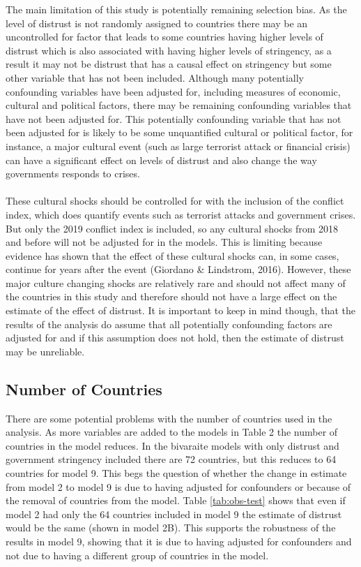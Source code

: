 \documentclass[
  12pt,
]{article}
\begin{document}
The main limitation of this study is potentially remaining selection bias. As the level of distrust is not randomly assigned to countries there may be an uncontrolled for factor that leads to some countries having higher levels of distrust which is also associated with having higher levels of stringency, as a result it may not be distrust that has a causal effect on stringency but some other variable that has not been included. Although many potentially confounding variables have been adjusted for, including measures of economic, cultural and political factors, there may be remaining confounding variables that have not been adjusted for. This potentially confounding variable that has not been adjusted for is likely to be some unquantified cultural or political factor, for instance, a major cultural event (such as large terrorist attack or financial crisis) can have a significant effect on levels of distrust and also change the way governments responds to crises.\\
~\\
These cultural shocks should be controlled for with the inclusion of the conflict index, which does quantify events such as terrorist attacks and government crises. But only the 2019 conflict index is included, so any cultural shocks from 2018 and before will not be adjusted for in the models. This is limiting because evidence has shown that the effect of these cultural shocks can, in some cases, continue for years after the event (Giordano \& Lindstrom, 2016). However, these major culture changing shocks are relatively rare and should not affect many of the countries in this study and therefore should not have a large effect on the estimate of the effect of distrust. It is important to keep in mind though, that the results of the analysis do assume that all potentially confounding factors are adjusted for and if this assumption does not hold, then the estimate of distrust may be unreliable.\\

\hypertarget{number-of-countries}{%
\subsection{Number of Countries}\label{number-of-countries}}

There are some potential problems with the number of countries used in the analysis. As more variables are added to the models in Table 2 the number of countries in the model reduces. In the bivaraite models with only distrust and government stringency included there are 72 countries, but this reduces to 64 countries for model 9. This begs the question of whether the change in estimate from model 2 to model 9 is due to having adjusted for confounders or because of the removal of countries from the model. Table \ref{tab:obs-test} shows that even if model 2 had only the 64 countries included in model 9 the estimate of distrust would be the same (shown in model 2B). This supports the robustness of the results in model 9, showing that it is due to having adjusted for confounders and not due to having a different group of countries in the model.\\
\end{document}
